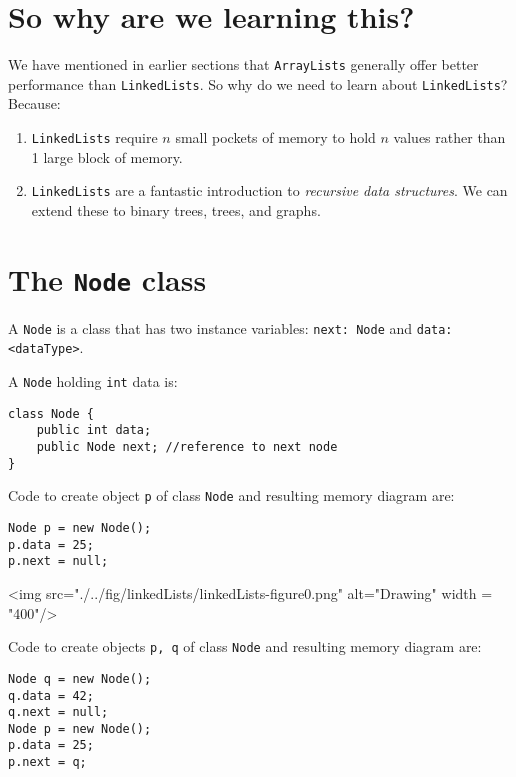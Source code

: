 \def\topic{Linked Lists}

 
\section{So why are we learning this?}

We have mentioned in earlier sections that \texttt{ArrayLists} generally offer better performance than \texttt{LinkedLists}. So why do we need to learn about \texttt{LinkedLists}? Because:

\begin{enumerate}
\item \texttt{LinkedLists} require $n$ small pockets of memory to hold $n$ values rather than 1 large block of memory.
\item \texttt{LinkedLists} are a fantastic introduction to \textit{recursive data structures}. We can extend these to binary trees, trees, and graphs.
\end{enumerate}

\section{The \texttt{Node} class}

A \texttt{Node} is a class that has two instance variables: \texttt{next: Node} and \texttt{data: <dataType>}. 

A \texttt{Node} holding \texttt{int} data is:

\begin{lstlisting}
class Node {
	public int data;
	public Node next; //reference to next node
}
\end{lstlisting}

Code to create object \texttt{p} of class \texttt{Node} and resulting memory diagram are:

\begin{lstlisting}
Node p = new Node();
p.data = 25;
p.next = null;
\end{lstlisting}


\begin{center}
<img src="./../fig/linkedLists/linkedLists-figure0.png" alt="Drawing" width = "400"/>
\end{center}

Code to create objects \texttt{p, q} of class \texttt{Node} and resulting memory diagram are:

\begin{lstlisting}
Node q = new Node();
q.data = 42;
q.next = null;
Node p = new Node();
p.data = 25;
p.next = q;
\end{lstlisting}

